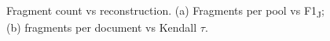 \begin{figure}[t]\centering

\caption{Fragment count vs reconstruction. (a) Fragments per pool vs F1\textsubscript{J}; (b) fragments per document vs Kendall $\tau$.}
\label{fig:7}
\end{figure}
